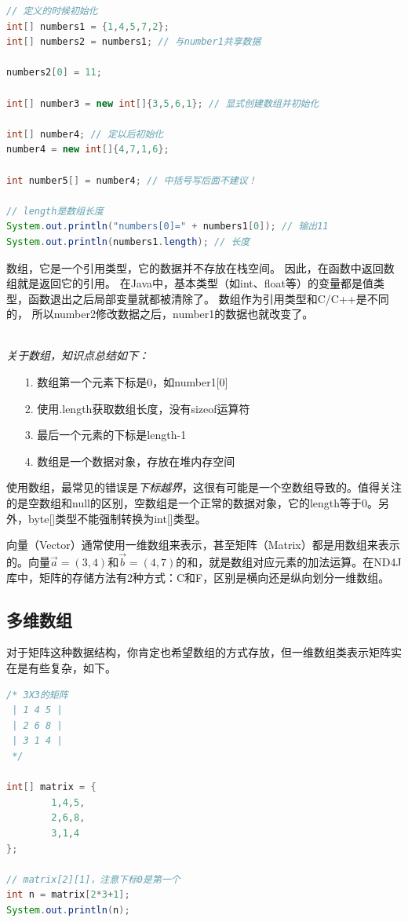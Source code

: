 \begin{lstlisting}[language=Java, caption={数组定义和初始化},label=code:part1_array_def]
// 定义的时候初始化
int[] numbers1 = {1,4,5,7,2};
int[] numbers2 = numbers1; // 与number1共享数据

numbers2[0] = 11;

int[] number3 = new int[]{3,5,6,1}; // 显式创建数组并初始化

int[] number4; // 定以后初始化
number4 = new int[]{4,7,1,6};

int number5[] = number4; // 中括号写后面不建议！

// length是数组长度
System.out.println("numbers[0]=" + numbers1[0]); // 输出11
System.out.println(numbers1.length); // 长度
\end{lstlisting}


数组，它是一个引用类型，它的数据并不存放在栈空间。
因此，在函数中返回数组就是返回它的引用。
在Java中，基本类型（如int、float等）的变量都是值类型，函数退出之后局部变量就都被清除了。
数组作为引用类型和C/C++是不同的，
所以number2修改数据之后，number1的数据也就改变了。

\ \\ \noindent
\emph{关于数组，知识点总结如下：}
\begin{itemize}
\item [1.] 数组第一个元素下标是0，如number1[0]
\item [2.] 使用.length获取数组长度，没有sizeof运算符
\item [3.] 最后一个元素的下标是length-1
\item [4.] 数组是一个数据对象，存放在堆内存空间
\end{itemize}

\noindent 使用数组，最常见的错误是\emph{下标越界}，这很有可能是一个空数组导致的。值得关注的是空数组和null的区别，空数组是一个正常的数据对象，它的length等于0。另外，byte[]类型不能强制转换为int[]类型。

向量（Vector）通常使用一维数组来表示，甚至矩阵（Matrix）都是用数组来表示的。向量$\vec{a}=(3,4)$和$\vec{b}=(4,7)$的和，就是数组对应元素的加法运算。在ND4J库中，矩阵的存储方法有2种方式：C和F，区别是横向还是纵向划分一维数组。

\subsection{多维数组}
对于矩阵这种数据结构，你肯定也希望数组的方式存放，但一维数组类表示矩阵实在是有些复杂，如下。
\begin{lstlisting}[language=Java, caption={矩阵的一维数组表示},label=code:part1_array_1dim_matrix]
/* 3X3的矩阵
 | 1 4 5 |
 | 2 6 8 |
 | 3 1 4 |
 */

int[] matrix = {
        1,4,5,
        2,6,8,
        3,1,4
};

// matrix[2][1]，注意下标0是第一个
int n = matrix[2*3+1];
System.out.println(n);
\end{lstlisting}

